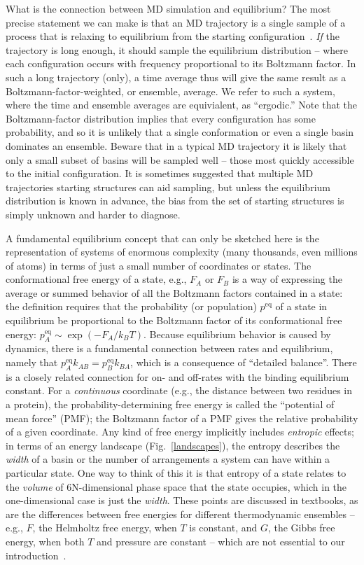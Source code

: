 \documentclass[9pt,bestpractices]{livecoms}
\newcommand{\peq}{p^{\mathrm{eq}}}
\begin{document}
What is the connection between MD simulation and equilibrium? The most precise statement we can make is that an MD trajectory is a single sample of a process that is relaxing to equilibrium from the starting configuration~\cite{Zuckerman:2015:StatisticalBiophysicsBlog, Zuckerman:2010:}.
\emph{If} the trajectory is long enough, it should sample the equilibrium distribution -- where each configuration occurs with frequency proportional to its Boltzmann factor.
In such a long trajectory (only), a time average thus will give the same result as a Boltzmann-factor-weighted, or ensemble, average.
We refer to such a system, where the time and ensemble averages are equivialent, as ``ergodic.''
Note that the Boltzmann-factor distribution implies that every configuration has some probability, and so it is unlikely that a single conformation or even a single basin dominates an ensemble.
Beware that in a typical MD trajectory it is likely that only a small subset of basins will be sampled well -- those most quickly accessible to the initial configuration.
It is sometimes suggested that multiple MD trajectories starting structures can aid sampling, but unless the equilibrium distribution is known in advance, the bias from the set of starting structures is simply unknown and harder to diagnose.

A fundamental equilibrium concept that can only be sketched here is the representation of systems of enormous complexity (many thousands, even millions of atoms) in terms of just a small number of coordinates or states.
The conformational free energy of a state, e.g., $F_A$ or $F_B$ is a way of expressing the average or summed behavior of all the Boltzmann factors contained in a state: the definition requires that the probability (or population) $\peq$ of a state in equilibrium be proportional to the Boltzmann factor of its conformational free energy: $\peq_A \sim \exp(-F_A/k_BT)$.
Because equilibrium behavior is caused by dynamics, there is a fundamental connection between rates and equilibrium, namely that $\peq_A k_{AB} = \peq_B k_{BA}$, which is a consequence of ``detailed balance''.
There is a closely related connection for on- and off-rates with the binding equilibrium constant.
For a \emph{continuous} coordinate (e.g., the distance between two residues in a protein), the probability-determining free energy is called the ``potential of mean force'' (PMF); the Boltzmann factor of a PMF gives the relative probability of a given coordinate.
Any kind of free energy implicitly includes \emph{entropic} effects; in terms of an energy landscape (Fig.\ \ref{landscapes}), the entropy describes the \emph{width} of a basin or the number of arrangements a system can have within a particular state.
One way to think of this it is that entropy of a state relates to the \emph{volume} of 6N-dimensional phase space that the state occupies, which in the one-dimensional case is just the \emph{width}.
These points are discussed in textbooks, as are the differences between free energies for different thermodynamic ensembles -- e.g., $F$, the Helmholtz free energy, when $T$ is constant, and $G$, the Gibbs free energy, when both $T$ and pressure are constant -- which are not essential to our introduction~\cite{DillBook, Zuckerman:2010:}.
\end{document}
